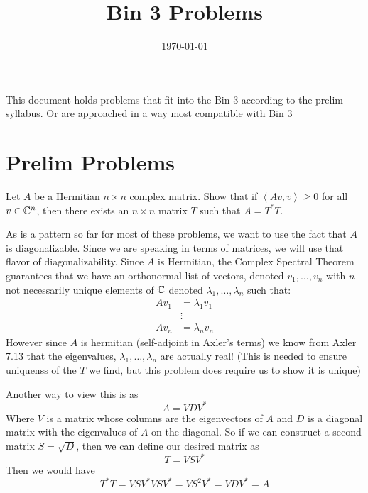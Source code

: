 \documentclass[answers]{exam}
\title{Bin 3 Problems}
\date{\today}
\author{}
\newcommand{\ip}[1]{\left\langle#1\right\rangle}
\begin{document}
\maketitle
This document holds problems that fit into the Bin 3 according to the prelim syllabus. Or are approached 
in a way most compatible with Bin 3

\tableofcontents

\section{Prelim Problems}
\begin{questions}
    \question Let $A$ be a Hermitian $n\times n$ complex matrix. Show that if $\ip{Av,v}\geq 0$ for all
    $v\in\mathbb{C}^n$, then there exists an $n\times n$ matrix $T$ such that $A=T^*T$.
    \begin{solution}
        
         As is a pattern so far for most of these problems, we want to use the fact that
        $A$ is diagonalizable. Since we are speaking in terms of matrices, we will use that flavor of
        diagonalizability. Since $A$ is Hermitian, the Complex Spectral Theorem guarantees that we have an 
        orthonormal list of vectors, denoted $v_1,\dots,v_n$ with $n$
        not necessarily unique elements of $\mathbb{C}$ denoted $\lambda_1,\dots,\lambda_n$ such that:
        \begin{align*}
            Av_1 &= \lambda_1v_1 \\
                 &\vdots\\
            Av_n &= \lambda_nv_n
        \end{align*}
        However since $A$ is hermitian (self-adjoint in Axler's terms) we know from Axler 7.13 that the 
        eigenvalues, $\lambda_1,\dots,\lambda_n$ are actually real! (This is needed to ensure uniquenss of 
        the $T$ we find, but this problem does require us to show it is unique)

        Another way to view this is as 
        \[
            A = VDV^*
        \]
        Where $V$ is a matrix whose columns are the eigenvectors of $A$ and $D$ is a diagonal matrix with the
        eigenvalues of $A$ on the diagonal. So if we can construct a second matrix $S = \sqrt{D}$, then we can
        define our desired matrix as 
        \[
            T = VSV^*
        \]
        Then we would have
        \[
            T^*T = VSV^*VSV^* = VS^2V^* = VDV^*=A
        \]


\end{solution}
\end{questions}
\end{document}
